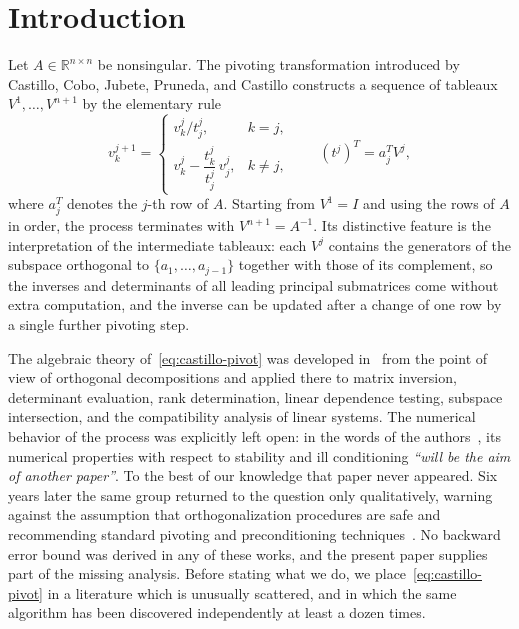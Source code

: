 \documentclass[review,onefignum,onetabnum]{siamart251216}
\newcommand{\R}{\mathbb{R}}
\begin{document}
\section{Introduction}
\label{sec:intro}

Let $A \in \R^{n\times n}$ be nonsingular. The pivoting transformation introduced by
Castillo, Cobo, Jubete, Pruneda, and Castillo \cite{CastilloCJPC2000,CastilloCJP1999}
constructs a sequence of tableaux $V^1,\dots,V^{n+1}$ by the elementary rule
%
\begin{equation}\label{eq:castillo-pivot}
v^{j+1}_k =
\begin{cases}
v^j_k / t^j_j, & k = j,\\[2pt]
v^j_k - \dfrac{t^j_k}{t^j_j}\, v^j_j, & k \neq j,
\end{cases}
\qquad
(t^j)^T = a_j^T V^j ,
\end{equation}
%
where $a_j^T$ denotes the $j$-th row of $A$. Starting from $V^1 = I$ and using the rows of $A$
in order, the process terminates with $V^{n+1} = A^{-1}$. Its distinctive feature is the interpretation of the intermediate tableaux: each $V^j$ contains
the generators of the subspace orthogonal to $\{a_1,\dots,a_{j-1}\}$ together with those of its
complement, so the inverses and determinants of all leading principal submatrices come without
extra computation, and the inverse can be updated after a change of one row by a single further
pivoting step.

The algebraic theory of~\eqref{eq:castillo-pivot} was developed in~\cite{CastilloCJPC2000} from
the point of view of orthogonal decompositions and applied there to matrix inversion, determinant
evaluation, rank determination, linear dependence testing, subspace intersection, and the
compatibility analysis of linear systems. The numerical behavior of the process was explicitly
left open: in the words of the authors~\cite[p.~667]{CastilloCJPC2000}, its numerical properties
with respect to stability and ill conditioning \emph{``will be the aim of another paper''}. To the
best of our knowledge that paper never appeared. Six years later the same group returned to the
question only qualitatively, warning against the assumption that orthogonalization procedures are
safe and recommending standard pivoting and preconditioning
techniques~\cite[\S2.1]{CastilloPSM2006,HerreroCP2002}. No backward error bound was derived in any
of these works, and the present paper supplies part of the missing analysis. Before stating what
we do, we place~\eqref{eq:castillo-pivot} in a literature which is unusually scattered, and in
which the same algorithm has been discovered independently at least a dozen times.
\end{document}
